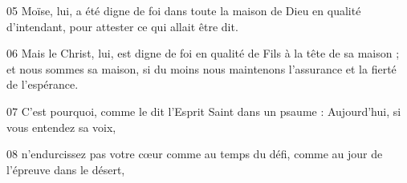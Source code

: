 
05 Moïse, lui, a été digne de foi dans toute la maison de Dieu en qualité d’intendant, pour attester ce qui allait être dit.

06 Mais le Christ, lui, est digne de foi en qualité de Fils à la tête de sa maison ; et nous sommes sa maison, si du moins nous maintenons l’assurance et la fierté de l’espérance.

07 C’est pourquoi, comme le dit l’Esprit Saint dans un psaume : Aujourd’hui, si vous entendez sa voix,

08 n’endurcissez pas votre cœur comme au temps du défi, comme au jour de l’épreuve dans le désert,
